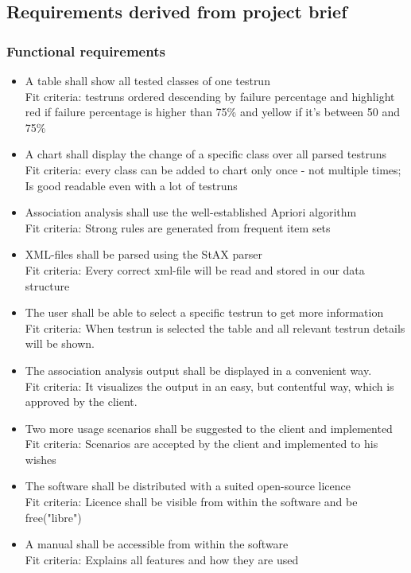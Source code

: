 \subsection{Requirements derived from project brief}
\subsubsection{Functional requirements}
\begin{itemize}	
	\item A table shall show all tested classes of one testrun\\
	Fit criteria: testruns ordered descending by failure percentage and highlight red if failure percentage is higher than 75\% and yellow if it's between 50 and 75\% 
	\item A chart shall display the change of a specific class over all parsed testruns\\
	Fit criteria: every class can be added to chart only once - not multiple times; Is good readable even with a lot of testruns
	\item Association analysis shall use the well-established Apriori algorithm\\
	Fit criteria: Strong rules are generated from frequent item sets
	\item XML-files shall be parsed using the StAX parser\\
	Fit criteria: Every correct xml-file will be read and stored in our data structure
	\item The user shall be able to select a specific testrun to get more information\\
	Fit criteria: When testrun is selected the table and all relevant testrun details will be shown.
	\item The association analysis output shall be displayed in a convenient way.\\
	Fit criteria: It visualizes the output in an easy, but contentful way, which is approved by the client.
	\item Two more usage scenarios shall be suggested to the client and implemented\\
	Fit criteria: Scenarios are accepted by the client and implemented to his wishes
	\item The software shall be distributed with a suited open-source licence\\
	Fit criteria: Licence shall be visible from within the software and be free("libre")
	\item A manual shall be accessible from within the software\\
	Fit criteria: Explains all features and how they are used
\end{itemize}

